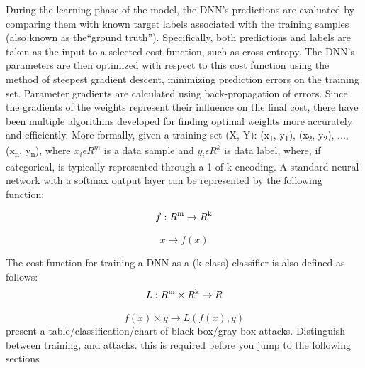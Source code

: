 \documentclass{article}
\newcommand{\ach}[1]{{\color{red}#1}}
\begin{document}
During the learning phase of the model, the DNN’s predictions are evaluated by comparing them with known target labels associated with the training samples (also known as the“ground truth”). Specifically, both predictions and labels are taken as the input to a selected cost function, such as cross-entropy. The DNN’s parameters are then optimized with respect to this cost function using the method of steepest gradient descent, minimizing prediction errors on the training set. Parameter gradients are calculated using back-propagation of errors. Since the gradients of the weights represent their influence on the final cost, there have been multiple algorithms developed for finding optimal weights more accurately and efficiently. More formally, given a training set (X, Y): {(x\textsubscript{1}, y\textsubscript{1}), (x\textsubscript{2}, y\textsubscript{2}), ...,(x\textsubscript{n}, y\textsubscript{n})}, where $x_i \epsilon R^m$ is a data sample and $y_i \epsilon R^k$ is data label, where, if categorical, is typically represented through a 1-of-k encoding. A standard neural network with a softmax output layer can be represented by the following function:

\begin{equation}
f : R\textsuperscript{m} \rightarrow R\textsuperscript{k}
\end{equation}

\begin{equation*}
x \rightarrow f(x)
\end{equation*}

The cost function for training a DNN as a (k-class) classifier is also defined as follows:
\begin{equation}
L : R\textsuperscript{m} \times R\textsuperscript{k} \rightarrow R
\end{equation}

\begin{equation*}
f(x) \times y \rightarrow L(f(x), y)
\end{equation*}
\ach{present a table/classification/chart of black box/gray box attacks. Distinguish between training, and attacks. this is required before you jump to the following sections}
\end{document}
